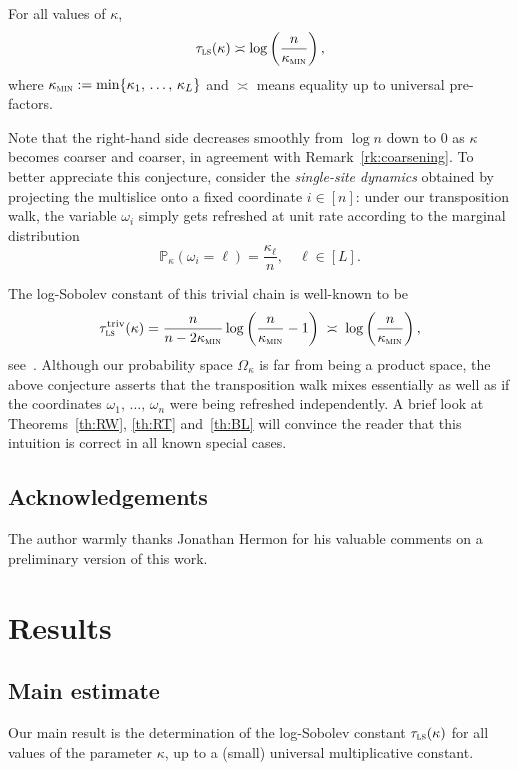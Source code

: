 \documentclass[AHL,Unicode,longabstracts,published]{cedram}
\newcommand{\PP}{\mathbb{P}}
\newcommand{\tls}{\tau_{\textsc{ls}}}
\newcommand{\am}{{\kappa_{\textsc{min}}}}
\DeclareMathOperator{\triv}{triv}
\begin{document}
\begin{conj}\label{cj:main}
For all values of $\kappa$,
\[
\tls(\kappa) \asymp \log \left(\frac{n}{\am}\right),
\]
where $\am:=\min\{\kappa_1,\,\ldots,\,\kappa_L\}$ and $\asymp$ means equality up to universal pre-factors.
\end{conj}

Note that the right-hand side decreases smoothly from $\log n $ down to $0$ as $\kappa$ becomes coarser and coarser, in agreement with Remark~\ref{rk:coarsening}. To better appreciate this conjecture, consider the \emph{single-site dynamics} obtained by projecting the multislice onto a fixed coordinate $i\in[n]$: under our transposition walk, the variable $\omega_i$ simply gets refreshed at unit rate according to the marginal distribution
\[
\PP_\kappa\left(\omega_i=\ell\right) = \frac{\kappa_\ell}{n},\quad \ell\in[L].
\]

The log-Sobolev constant of this trivial chain is well-known to be
\[
\tls^{\triv}(\kappa) = \frac{n}{n-{2\am}}\log\left(\frac{n}{\am}-1\right) \; \asymp \; \log \left(\frac{n}{\am}\right),
\]
see~\cite[Theorem~A.1]{MR1410112}. Although our probability space $\Omega_\kappa$ is far from being a product space, the above conjecture asserts that the transposition walk mixes essentially as well as if the coordinates $\omega_1,\,\ldots,\,\omega_n$ were being refreshed independently. A brief look at Theorems~\ref{th:RW}, \ref{th:RT} and~\ref{th:BL} will convince the reader that this intuition is correct in all known special cases.


\subsection*{Acknowledgements}
The author warmly thanks Jonathan Hermon for his valuable comments on a preliminary version of this work.



\section{Results}

\subsection{Main estimate}\label{sec:appli}
Our main result is the determination of the log-Sobolev constant $\tls(\kappa)$ for all values of the parameter $\kappa$, up to a (small) universal multiplicative constant.
\end{document}
